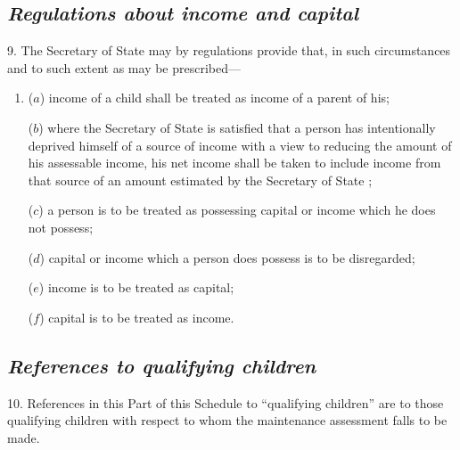 \documentclass[12pt,a4paper]{article}
\begin{document}

\subsection*{\itshape Regulations about income and capital}

9. The Secretary of State may by regulations provide that, in such circumstances and to such extent as may be prescribed—
\begin{enumerate}\item[]
($a$) income of a child shall be treated as income of a parent of his;

($b$) where 
the Secretary of State  %
is satisfied that a person has intentionally deprived himself of a source of income with a view to reducing the amount of his assessable income, his net income shall be taken to include income from that source of an amount estimated by 
the Secretary of State%
;

($c$) a person is to be treated as possessing capital or income which he does not possess;

($d$) capital or income which a person does possess is to be disregarded;

($e$) income is to be treated as capital;

($f$) capital is to be treated as income.
\end{enumerate}


\subsection*{\itshape References to qualifying children}

10. References in this Part of this Schedule to “qualifying children” are to those qualifying children with respect to whom the maintenance assessment falls to be made.

\end{document}
